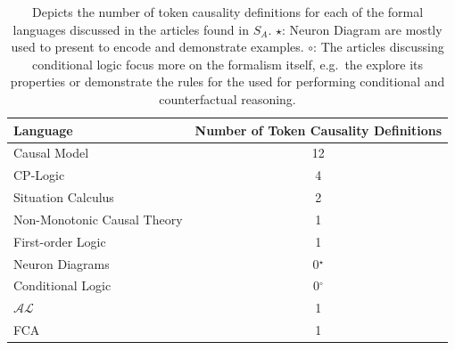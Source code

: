 \documentclass[11pt,a4paper]{book}
\theoremstyle{definition}
\theoremstyle{definition}
\theoremstyle{definition}
\theoremstyle{remark}
\newcommand{\prset}{S_{A}}
\begin{document}
\begin{table}
\centering
\scriptsize
\begin{tabular}{lc}
\toprule
Language & Number of Token Causality Definitions\\   
\midrule        
Causal Model	& 12\\
CP-Logic	& 4 \\
Situation Calculus & 2 \\
 Non-Monotonic Causal Theory & 1 \\
 First-order Logic & 1 \\
 Neuron Diagrams & 	0$^{\star}$\\
 Conditional Logic	& 0$^{\circ}$ \\
 $\mathcal{AL}$	& 1\\
 FCA & 1\\ 
\bottomrule
\end{tabular}
\caption{Depicts the number of token causality definitions for each of the formal languages discussed in the articles found in $\prset$.
$\star$: Neuron Diagram are mostly used to present to encode and demonstrate examples. 
$\circ$: The articles discussing conditional logic focus more on the formalism itself, e.g.\ the explore its properties or demonstrate the rules for the used for performing conditional and counterfactual reasoning.}
\label{tab:definition_language_count}
\end{table}
\end{document}
